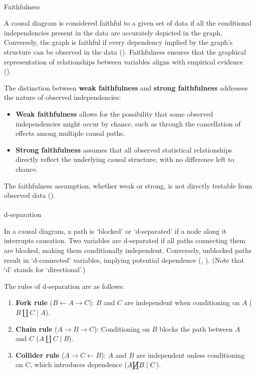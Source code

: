 \documentclass[
  single column]{article}
\makeatletter
\let\oldparagraph\paragraph
\renewcommand{\paragraph}{
    \@ifstar
      \xxxParagraphStar
      \xxxParagraphNoStar
  }
\newcommand{\xxxParagraphStar}[1]{\oldparagraph*{#1}\mbox{}}
\newcommand{\xxxParagraphNoStar}[1]{\oldparagraph{#1}\mbox{}}
\providecommand{\tightlist}{%
  \setlength{\itemsep}{0pt}\setlength{\parskip}{0pt}}\usepackage{longtable,booktabs,array}
\makeatother
\begin{document}
\paragraph{Faithfulness}\label{faithfulness}

A causal diagram is considered faithful to a given set of data if all
the conditional independencies present in the data are accurately
depicted in the graph. Conversely, the graph is faithful if every
dependency implied by the graph's structure can be observed in the data
(). Faithfulness
ensures that the graphical representation of relationships between
variables aligns with empirical evidence
().

The distinction between \textbf{weak faithfulness} and \textbf{strong
faithfulness} addresses the nature of observed independencies:

\begin{itemize}
\tightlist
\item
  \textbf{Weak faithfulness} allows for the possibility that some
  observed independencies might occur by chance, such as through the
  cancellation of effects among multiple causal paths.
\item
  \textbf{Strong faithfulness} assumes that all observed statistical
  relationships directly reflect the underlying causal structure, with
  no difference left to chance.
\end{itemize}

The faithfulness assumption, whether weak or strong, is not directly
testable from observed data ().

\paragraph{d-separation}\label{d-separation}

In a causal diagram, a path is `blocked' or `d-separated' if a node
along it interrupts causation. Two variables are d-separated if all
paths connecting them are blocked, making them conditionally
independent. Conversely, unblocked paths result in `d-connected'
variables, implying potential dependence (, ). (Note that `d' stands for
`directional'.)

The rules of d-separation are as follows:

\begin{enumerate}
\def\labelenumi{\arabic{enumi}.}
\tightlist
\item
  \textbf{Fork rule} (\(B \leftarrow \boxed{A} \rightarrow C\)): \(B\)
  and \(C\) are independent when conditioning on \(A\)
  (\(B \coprod C \mid A\)).
\item
  \textbf{Chain rule} (\(A \rightarrow \boxed{B} \rightarrow C\)):
  Conditioning on \(B\) blocks the path between \(A\) and \(C\)
  (\(A \coprod C \mid B\)).
\item
  \textbf{Collider rule} (\(A \rightarrow \boxed{C} \leftarrow B\)):
  \(A\) and \(B\) are independent unless conditioning on \(C\), which
  introduces dependence (\(A \cancel{\coprod} B \mid C\)).
\end{enumerate}
\end{document}
